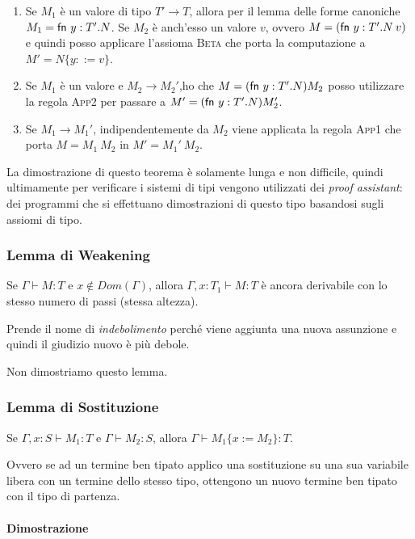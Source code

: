 \begin{itemize}
	\begin{enumerate}[a]
		\item Se $M_1$ è un valore di tipo $T' \rightarrow T$, allora per il lemma delle forme canoniche $M_1 = \fn y:T'.N$. Se $M_2$ è anch'esso un valore $v$, ovvero $M = (\fn y:T'.N \: v)$ e quindi posso applicare l'assioma \textsc{Beta} che porta la computazione a $M' = N\{y ::= v\}$.
		\item Se $M_1$ è un valore e $M_2 \rightarrow M_2'$,ho che $M = (\fn y:T'.N) M_2$ posso utilizzare la regola \textsc{App2} per passare a $M' = (\fn y:T'.N) M_2'$.
		\item Se $M_1 \rightarrow M_1'$, indipendentemente da $M_2$ viene applicata la regola \textsc{App1} che porta $M = M_1 \: M_2 $ in $M' = M_1' \: M_2$. 
	\end{enumerate}
\end{itemize}

\noindent La dimostrazione di questo teorema è solamente lunga e non difficile, quindi ultimamente per verificare i sistemi di tipi vengono utilizzati dei \textit{proof assistant}: dei programmi che si effettuano dimostrazioni di questo tipo basandosi sugli assiomi di tipo.

\subsubsection{Lemma di Weakening}

Se $\Gamma \vdash M : T $ e $x \notin Dom(\Gamma)$, allora $\Gamma, x : T_1 \vdash M : T$ è ancora derivabile con lo stesso numero di passi (stessa altezza).

Prende il nome di \textit{indebolimento} perché viene aggiunta una nuova assunzione e quindi il giudizio nuovo è più debole.

Non dimostriamo questo lemma.

\subsubsection{Lemma di Sostituzione}

Se $\Gamma, x: S \vdash M_1 : T$ e $\Gamma \vdash M_2 : S$, allora $\Gamma \vdash M_1\{x := M_2\}: T$.

Ovvero se ad un termine ben tipato applico una sostituzione su una sua variabile libera con un termine dello stesso tipo, ottengono un nuovo termine ben tipato con il tipo di partenza.

\paragraph{Dimostrazione}

